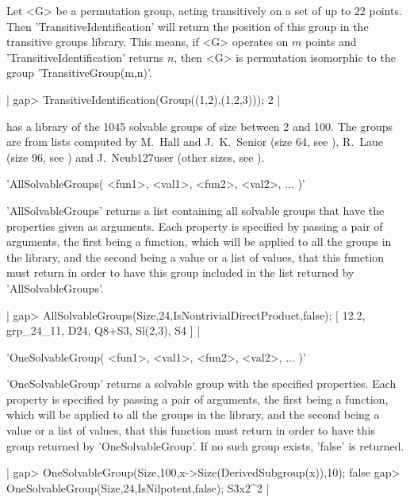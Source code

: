 Let <G> be a permutation group, acting transitively on a set  of up to 22
points.  Then 'TransitiveIdentification' will return the position of this
group in the transitive  groups library.  This means,  if <G> operates on
$m$ points and    'TransitiveIdentification'  returns $n$,  then <G>   is
permutation isomorphic to the group 'TransitiveGroup(m,n)'.

|    gap> TransitiveIdentification(Group((1,2),(1,2,3)));
    2 |

\newpage
{}

{\GAP} has a library of the 1045 solvable  groups  of size between 2  and
100.   The  groups are  from lists  computed by  M.~Hall and J.~K.~Senior
(size  64, see  \cite{HS64}),  R.~Laue (size 96,  see  \cite{Lau82})  and
J.~Neub{\accent127u}ser (other sizes, see \cite{Neu67}).

\vspace{5mm}
'AllSolvableGroups( <fun1>, <val1>, <fun2>, <val2>, ... )'%

'AllSolvableGroups'  returns a  list  containing all solvable groups that
have the properties  given  as arguments.  Each property is specified  by
passing a pair of arguments, the first  being  a function, which will  be
applied to all the groups in the library, and the second being a value or
a list of  values, that this function must return in  order to have  this
group included in the list returned by 'AllSolvableGroups'.

|    gap> AllSolvableGroups(Size,24,IsNontrivialDirectProduct,false);
    [ 12.2, grp_24_11, D24, Q8+S3, Sl(2,3), S4 ] |

\vspace{5mm}
'OneSolvableGroup( <fun1>, <val1>, <fun2>, <val2>, ... )'%

'OneSolvableGroup'   returns   a   solvable  group  with   the  specified
properties.   Each property is specified by passing  a pair of arguments,
the first being a  function, which will  be applied to all  the groups in
the library, and the second being  a value or a list of values, that this
function  must   return  in  order   to   have  this  group  returned  by
'OneSolvableGroup'.  If no such group exists, 'false' is returned.

|    gap> OneSolvableGroup(Size,100,x->Size(DerivedSubgroup(x)),10);
    false
    gap> OneSolvableGroup(Size,24,IsNilpotent,false);
    S3x2^2 |

